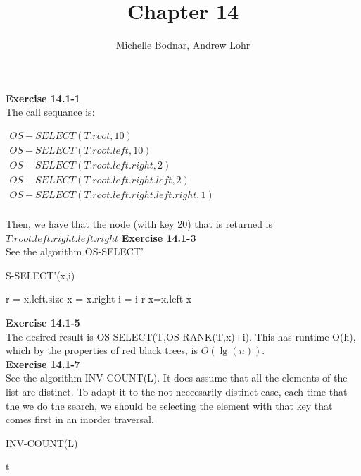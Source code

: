 \documentclass{article}
\title{Chapter 14}
\author{Michelle Bodnar, Andrew Lohr}
\begin{document}
\maketitle

\noindent\textbf{ Exercise 14.1-1} \\

The call sequance is:

$
\begin{array}{l}
OS-SELECT(T.root,10)\\
OS-SELECT(T.root.left,10)\\
OS-SELECT(T.root.left.right,2)\\
OS-SELECT(T.root.left.right.left,2)\\
OS-SELECT(T.root.left.right.left.right,1)\\
\end{array}
$

Then, we have that the node (with key 20) that is returned is $T.root.left.right.left.right$
\noindent\textbf{ Exercise 14.1-3} \\
See the algorithm OS-SELECT'
\begin{algorithm}
\caption OS-SELECT'(x,i)
\begin{algorithmic}
\State r = x.left.size
\State x = x.right
\State i = i-r
\Else
\State x=x.left
\EndIf
{}
\EndWhile
\State \Return x
\end{algorithmic}
\end{algorithm}

\noindent\textbf{ Exercise 14.1-5} \\

The desired result is OS-SELECT(T,OS-RANK(T,x)+i). This has runtime O(h), which by the properties of red black trees, is $O(\lg(n))$.\\

\noindent\textbf{ Exercise 14.1-7} \\
See the algorithm INV-COUNT(L). It does assume that all the elements of the list are distinct. To adapt it to the not neccesarily distinct case, each time that the we do the search, we should be selecting the element with that key that comes first in an inorder traversal.\\


\begin{algorithm}
\caption{INV-COUNT(L)}
\begin{algorithmic}
\EndFor
\State \Return t
\end{algorithmic}
\end{algorithm}
\end{document}

